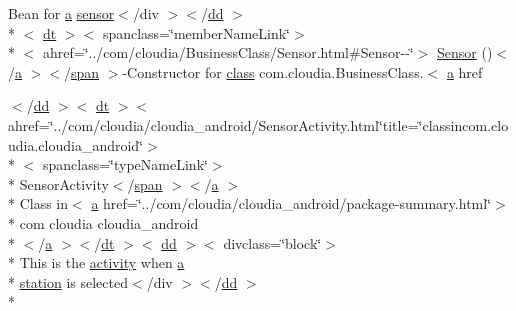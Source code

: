 \begin{DoxyCompactItemize}
 Bean for \hyperlink{style_8css_a5e8981582017bb8b84c21f148345d1f7}{a} \hyperlink{index-17_8html_a473de8198e1708e7f705d9a565cff824}{sensor}$<$/div $>$$<$/\hyperlink{stylesheet_8css_a47f4718a86835a7771ec592ece845221}{dd} $>$\\*
$<$ \hyperlink{stylesheet_8css_a107565fb4039d33b041380d6e0ea1d80}{dt} $>$$<$ spanclass=\char`\"{}member\-Name\-Link\char`\"{}$>$\\*
$<$ ahref=\char`\"{}../com/cloudia/Business\-Class/Sensor.\-html\#Sensor-\/-\/\char`\"{}$>$ \hyperlink{index-17_8html_aef703db9c04b29208c487a4b3b458b28}{Sensor} ()$<$/\hyperlink{style_8css_a5e8981582017bb8b84c21f148345d1f7}{a} $>$$<$/\hyperlink{stylesheet_8css_a8343996ebcf16220b04e54659aac31cc}{span} $>$-\/Constructor for \hyperlink{_tools_8html_acf06f836132665ba8114f5a414c2403f}{class} com.\-cloudia.\-Business\-Class.$<$ \hyperlink{style_8css_a5e8981582017bb8b84c21f148345d1f7}{a} href
\item 
$<$/\hyperlink{stylesheet_8css_a47f4718a86835a7771ec592ece845221}{dd} $>$$<$ \hyperlink{stylesheet_8css_a107565fb4039d33b041380d6e0ea1d80}{dt} $>$$<$ ahref=\char`\"{}../com/cloudia/cloudia\-\_\-android/Sensor\-Activity.\-html\char`\"{}title=\char`\"{}classincom.\-cloudia.\-cloudia\-\_\-android\char`\"{}$>$\\*
$<$ spanclass=\char`\"{}type\-Name\-Link\char`\"{}$>$\\*
 Sensor\-Activity$<$/\hyperlink{stylesheet_8css_a8343996ebcf16220b04e54659aac31cc}{span} $>$$<$/\hyperlink{style_8css_a5e8981582017bb8b84c21f148345d1f7}{a} $>$\\*
 Class in$<$ \hyperlink{style_8css_a5e8981582017bb8b84c21f148345d1f7}{a} href=\char`\"{}../com/cloudia/cloudia\-\_\-android/package-\/summary.\-html\char`\"{}$>$\\*
 com cloudia cloudia\-\_\-android\\*
$<$/\hyperlink{style_8css_a5e8981582017bb8b84c21f148345d1f7}{a} $>$$<$/\hyperlink{stylesheet_8css_a107565fb4039d33b041380d6e0ea1d80}{dt} $>$$<$ \hyperlink{stylesheet_8css_a47f4718a86835a7771ec592ece845221}{dd} $>$$<$ divclass=\char`\"{}block\char`\"{}$>$\\*
 This is the \hyperlink{_sensor_activity_8html_a27ce96cb0fb53311961cb30579c7f77e}{activity} when \hyperlink{style_8css_a5e8981582017bb8b84c21f148345d1f7}{a} \\*
\hyperlink{nav__app_8js_a71d7bfaa2081410e47cd5a835af1564d}{station} is selected$<$/div $>$$<$/\hyperlink{stylesheet_8css_a47f4718a86835a7771ec592ece845221}{dd} $>$\\*

\end{DoxyCompactItemize}
